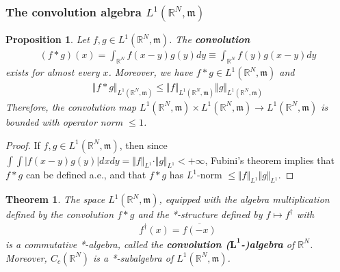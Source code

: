 \documentclass[12pt,b5paper,notitlepage]{article}
\theoremstyle{definition}
\theoremstyle{plain}
\newtheorem{thm}[df]{Theorem}
\newtheorem{pp}[df]{Proposition}
\newcommand{\ovl}{\overline}
\newcommand{\Rbb}{\mathbb R}
\newcommand{\mk}{\mathfrak m}
\numberwithin{equation}{section}
\begin{document}
\subsubsection{The convolution algebra $L^1(\Rbb^N,\mk)$}

\begin{pp}
Let $f,g\in L^1(\Rbb^N,\mk)$. The \textbf{convolution} 
\begin{align*}
(f*g)(x)=\int_{\Rbb^N}f(x-y)g(y)dy\equiv \int_{\Rbb^N}f(y)g(x-y)dy
\end{align*}
exists for almost every $x$. Moreover, we have $f*g\in L^1(\Rbb^N,\mk)$ and
\begin{align}\label{eq253}
\Vert f*g\Vert_{L^1(\Rbb^N,\mk)}\leq\Vert f\Vert_{L^1(\Rbb^N,\mk)}\Vert g\Vert_{L^1(\Rbb^N,\mk)}
\end{align}
Therefore, the convolution map $L^1(\Rbb^N,\mk)\times L^1(\Rbb^N,\mk)\rightarrow L^1(\Rbb^N,\mk)$ is bounded with operator norm $\leq 1$.
\end{pp}


\begin{proof}
If $f,g\in L^1(\Rbb^N,\mk)$, then since $\int\int |f(x-y)g(y)|dxdy=\Vert f\Vert_{L^1}\cdot\Vert g\Vert_{L^1}<+\infty$, Fubini's theorem implies that $f*g$ can be defined a.e., and that $f*g$ has $L^1$-norm $\leq \Vert f\Vert_{L^1}\Vert g\Vert_{L^1}$.
\end{proof}

\begin{thm}\label{lb512}
The space $L^1(\Rbb^N,\mk)$, equipped with the algebra multiplication defined by the convolution $f*g$ and the *-structure defined by $f\mapsto f^\dagger$ with
\begin{align*}
f^\dagger(x)=\ovl{f(-x)}
\end{align*}
is a commutative *-algebra, called the \textbf{convolution ($\pmb{L^1}$-)algebra}  of $\Rbb^N$. Moreover, $C_c(\Rbb^N)$ is a *-subalgebra of $L^1(\Rbb^N,\mk)$.
\end{thm}
\end{document}
